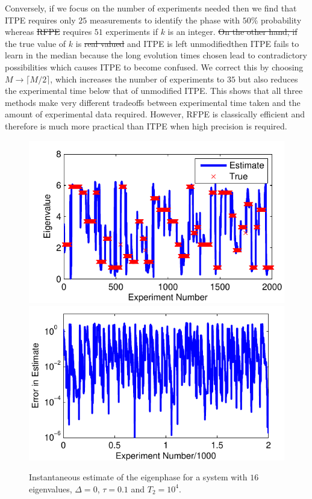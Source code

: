 \documentclass[aps,pra,amsmath,twocolumn,amssymb,superscriptaddress]{revtex4-1}
\providecommand{\DIFaddtex}[1]{{\protect\color{blue}\uwave{#1}}} %
\providecommand{\DIFdeltex}[1]{{\protect\color{red}\sout{#1}}}                      %
\providecommand{\DIFaddbegin}{} %
\providecommand{\DIFaddend}{} %
\providecommand{\DIFdelbegin}{} %
\providecommand{\DIFdelend}{} %
\providecommand{\DIFadd}[1]{\texorpdfstring{\DIFaddtex{#1}}{#1}} %
\providecommand{\DIFdel}[1]{\texorpdfstring{\DIFdeltex{#1}}{}} %
\begin{document}
Conversely, if we focus on the number of experiments needed then we find that
ITPE requires only $25$ measurements to identify the phase with $50\%$
probability whereas \DIFdelbegin %
\DIFdel{RFPE }%
\DIFdelend \DIFaddbegin \DIFadd{RFPE }\DIFaddend requires $51$ experiments if $k$ is an integer.  \DIFdelbegin \DIFdel{On the other hand, if }\DIFdelend \DIFaddbegin \DIFadd{If
}\DIFaddend the true value of $k$ is \DIFdelbegin \DIFdel{real valued }\DIFdelend \DIFaddbegin \DIFadd{real-valued }\DIFaddend and ITPE is left unmodified\DIFaddbegin \DIFadd{, }\DIFaddend then  ITPE
fails to learn in the median because the long evolution times chosen lead to
contradictory possibilities which causes ITPE to become confused.  We correct
this by choosing $M\rightarrow \lceil M/2\rceil$, which increases the number
of experiments to $35$ but also reduces the experimental time below that of
unmodified ITPE.  This shows that all three methods make very different
tradeoffs between experimental time taken and the amount of experimental data
required.  However, RFPE is classically efficient and therefore is much more
practical than ITPE when high precision is required.

\DIFdelbegin %

\DIFdelend \begin{figure}
    \begin{centering}
        \includegraphics[width=0.4\linewidth]{Errtrack1.pdf}
        \hspace{5mm}
        \includegraphics[width=0.4\linewidth]{Errtrack2.pdf}
    \end{centering}
    \caption{\label{fig:Errplot}
        Instantaneous estimate of the eigenphase  for a system with $16$ eigenvalues, $\Delta=0$, $\tau=0.1$ and $T_2=10^4$.
    }
\end{figure}
\end{document}
